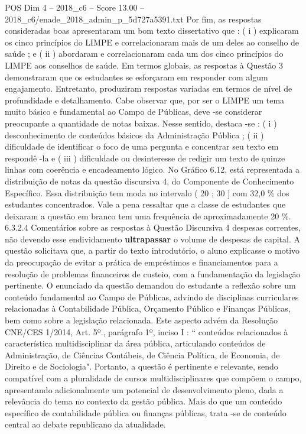 \begin{textsample}{POS Dim 4 – 2018\_c6 – Score 13.00 – 2018\_c6/enade\_2018\_admin\_p\_5d727a5391.txt}
Por fim, as respostas consideradas boas apresentaram um bom texto dissertativo que : ( i ) explicaram os cinco princípios do LIMPE e correlacionaram mais de um deles ao conselho de saúde ; e ( ii ) abordaram e correlacionaram cada um dos cinco princípios do LIMPE aos conselhos de saúde.
Em termos globais, as respostas à Questão 3 demonstraram que os estudantes se esforçaram em responder com algum engajamento.
Entretanto, produziram respostas variadas em termos de nível de profundidade e detalhamento.
Cabe observar que, por ser o LIMPE um tema muito básico e fundamental ao Campo de Públicas, deve -se considerar preocupante a quantidade de notas baixas.
Nesse sentido, destaca -se : ( i ) desconhecimento de conteúdos básicos da Administração Pública ; ( ii ) dificuldade de identificar o foco de uma pergunta e concentrar seu texto em respondê -la e ( iii ) dificuldade ou desinteresse de redigir um texto de quinze linhas com coerência e encadeamento lógico.
No Gráfico 6.12, está representada a distribuição de notas da questão discursiva 4, do Componente de Conhecimento Específico.
Essa distribuição tem moda no intervalo ( 20 ; 30 ] com 32,0 \% dos estudantes concentrados.
Vale a pena ressaltar que a classe de estudantes que deixaram a questão em branco tem uma frequência de aproximadamente 20 \%. 6.3.2.4 Comentários sobre as respostas à Questão Discursiva 4 despesas correntes, não devendo esse endividamento \textbf{ultrapassar} o volume de despesas de capital.
A questão solicitava que, a partir do texto introdutório, o aluno explicasse o motivo da preocupação de evitar a prática de empréstimos e financiamentos para a resolução de problemas financeiros de custeio, com a fundamentação da legislação pertinente.
O enunciado da questão demandou do estudante a reflexão sobre um conteúdo fundamental ao Campo de Públicas, advindo de disciplinas curriculares relacionadas à Contabilidade Pública, Orçamento Público e Finanças Públicas, bem como sobre a legislação relacionada.
Este aspecto advém da Resolução CNE/CES 1/2014, Art. 5º., parágrafo 1º, inciso I : “ conteúdos relacionados à característica multidisciplinar da área pública, articulando conteúdos de Administração, de Ciências Contábeis, de Ciência Política, de Economia, de Direito e de Sociologia".
Portanto, a questão é pertinente e relevante, sendo compatível com a pluralidade de cursos multidisciplinares que compõem o campo, apresentando adicionalmente um potencial de desenvolvimento pleno, dada a relevância do tema no contexto da gestão pública.
Mais do que um conteúdo específico de contabilidade pública ou finanças públicas, trata -se de conteúdo central ao debate republicano da atualidade.

\end{textsample}
